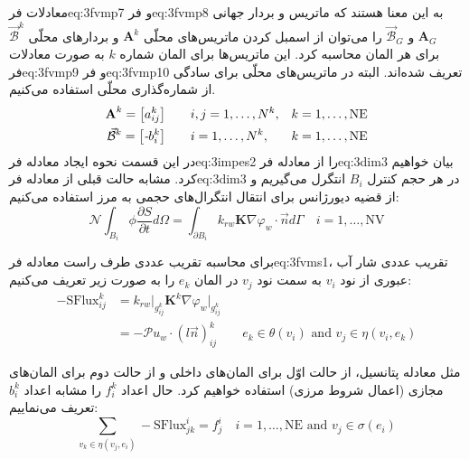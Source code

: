 معادلات ‌فر{eq:3fvmp7} و ‌فر{eq:3fvmp8} به این معنا هستند که ماتریس‌ و بردار جهانی  $\textbf{A}_G$ و $\vec{\mathcal B}_G$ را می‌توان از اسمبل کردن ماتریس‌‌های محلّی $\textbf{A}^k$ و بردارهای محلّی $\vec{\mathcal B}^k$ برای هر المان محاسبه کرد. این ماتریس‌ها برای المان شماره $k$ به صورت معادلات ‌فر{eq:3fvmp9} و ‌فر{eq:3fvmp10} تعریف شده‌اند. البته در ماتریس‌های محلّی برای سادگی از شماره‌گذاری محلّی استفاده می‌کنیم.
\begin{align}
\label{eq:3fvmp9}
\textbf{A}^k = \left[ a_{ij}^k \right]   \qquad		&i,j = 1,\ldots,N^k,  	&k=1,\ldots,\text{NE}\\
\label{eq:3fvmp10}
\vec{\mathcal B}^k = \left[ \emph{-}b_i^k \right] \qquad	&i= 1,\ldots,N^k,    	&k=1,\ldots,\text{NE}
\end{align} 
\label{ch:352}
در این قسمت نحوه ایجاد معادله ‌فر{eq:3impes2} را از معادله ‌فر{eq:3dim3} بیان خواهیم کرد. مشابه حالت قبلی از معادله ‌فر{eq:3dim3} در هر حجم کنترل $B_i$ انتگرل می‌گیریم و از قضیه دیورژانس برای انتقال انتگرال‌های حجمی به مرز استفاده می‌کنیم:
\begin{equation}
\label{eq:3fvms1}
\mathcal N \int_{B_i}  \phi \frac{\partial S}{\partial t} d\Omega =
\int_{\partial B_i} 
k_{rw} \textbf{K} \nabla \varphi_w \cdot \vec{n} d\Gamma
\quad i=1,\ldots,\text{NV}
\end{equation}

برای محاسبه تقریب عددی طرف راست معادله ‌فر{eq:3fvms1}، تقریب عددی شار آب عبوری از نود $v_i$ به سمت نود $v_j$ در المان $e_k$ را به صورت زیر تعریف می‌کنیم:
\begin{equation}
\label{eq:3fvms2}
\begin{aligned}
-\text{SFlux}_{ij}^k 
&=
\left.k_{rw}\right|_{g_{ij}^k} \textbf{K}^k \nabla \varphi_w|_{g_{ij}^k} \\
&= -\mathcal{P}u_w \cdot (l\vec{n})_{ij}^k
\qquad e_k \in \theta(v_i) \text{  and  } v_j \in \eta(v_i,e_k)
\end{aligned}
\end{equation}

مثل معادله پتانسیل، از حالت اوّل برای المان‌های داخلی و از حالت دوم برای المان‌های مجازی (اعمال شروط مرزی) استفاده خواهیم کرد. حال اعداد $f_i^k$ را مشابه اعداد $b_i^k$ تعریف می‌نماییم:
\begin{equation}
\label{eq:3fvms3}
\sum_{v_k\in\eta(v_j,e_i)} -\text{SFlux}_{jk}^i = f_j^i
\quad i = 1,\ldots,\text{NE} \text{  and  } v_j \in \sigma(e_i)
\end{equation}


